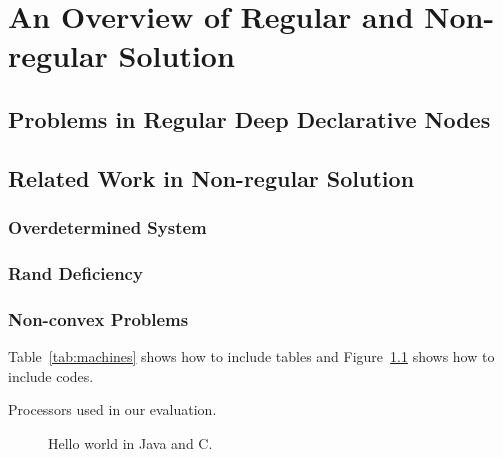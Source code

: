 \chapter{An Overview of Regular and Non-regular Solution}
\label{cha:overviewpart2}

\section{Problems in Regular Deep Declarative Nodes}
\label{sec:problems}



\section{Related Work in Non-regular Solution}
\label{sec:relatedworknonreg}

\subsection{Overdetermined System}

\subsection{Rand Deficiency}

\subsection{Non-convex Problems}










Table~\ref{tab:machines} shows how to include tables and Figure~\ref{fig:helloworld} shows how to include codes.
\begin{table*}
  \centering
  
  \caption{Processors used in our evaluation.}
  \label{tab:machines}
\end{table*}



\begin{figure}
  \centering
  \subfigure[\label{fig:c:hello}]{
  \begin{minipage}[b]{\columnwidth}
    \vspace*{-2ex}
  \end{minipage}}
  \subfigure[\label{fig:java:hello}]{
  \begin{minipage}[b]{\columnwidth}
    \vspace*{-2ex}
  \end{minipage}}
  \caption{Hello world in Java and C.}
  \label{fig:helloworld}
\end{figure}



